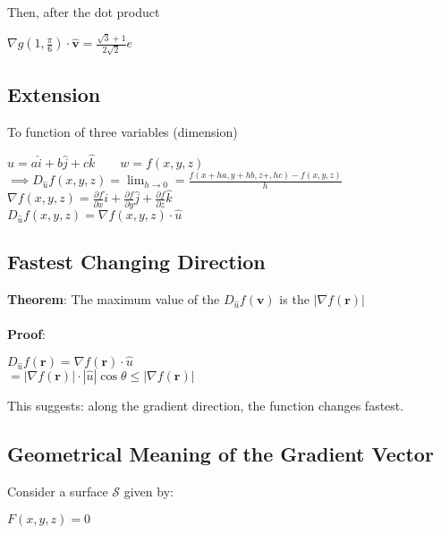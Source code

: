Then, after the dot product

\begin{center}
$\nabla g(1,\frac{\pi}{6})\cdot \mathbf{\hat{v}}=\frac{\sqrt{3}+1}{2\sqrt{2}}e$
\end{center}

\subsection{Extension}
To function of three variables (dimension)

\begin{center}
$\hat{u}=a\hat{i}+b\hat{j}+c\hat{k} \qquad w=f(x,y,z)$\\
$\implies D_{\hat{u}}f(x,y,z)=\displaystyle\lim_{h\rightarrow 0}=\frac{f(x+ha,y+hb,z+,hc)-f(x,y,z)}{h}$\\
$\nabla f(x,y,z)=\frac{\partial f}{\partial x}\hat{i}+\frac{\partial f}{\partial y}\hat{j}+\frac{\partial f}{\partial z}\hat{k}$\\
$\boxed{D_{\hat{u}}f(x,y,z)=\nabla f(x,y,z)\cdot \hat{u}}$
\end{center}

\subsection{Fastest Changing Direction}
\textbf{Theorem}: The maximum value of the $D_{\hat{u}}f(\mathbf{v})$ is the $|\nabla f(\mathbf{r})|$\\ \\

\textbf{Proof}:

\begin{center}
$D_{\hat{u}}f(\mathbf{r})=\nabla f(\mathbf{r})\cdot \hat{u}$\\
$= |\nabla f(\mathbf{r})|\cdot |\hat{u}|\cos \theta \leq |\nabla f(\mathbf{r})|$
\end{center}

This suggests: along the gradient direction, the function changes fastest.

\subsection{Geometrical Meaning of the Gradient Vector}
Consider a surface $\mathcal{S}$ given by:

\begin{center}
$F(x,y,z)=0$
\end{center}

